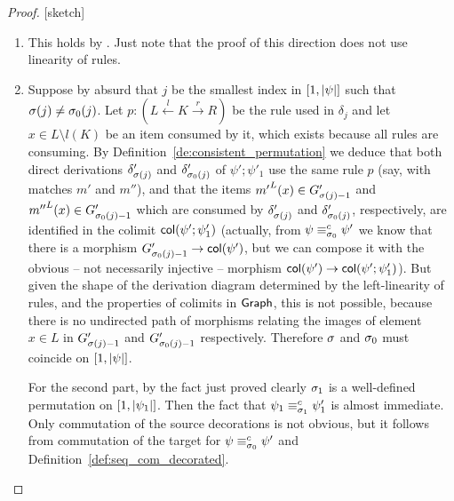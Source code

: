 \begin{proof}{[sketch]}
\begin{enumerate}
\item This holds by  \cite[Thm. 3.5.3]{Handbook}. Just note that the proof of this direction does not use linearity of rules. 

\item Suppose by absurd that  $j$ be the smallest index in $[{1},{|\psi|}]$ such that 
$\sigma(j) \not =  \sigma_0(j)$. Let  $p : (L \stackrel{l}{\leftarrow} K \stackrel{r}{\rightarrow} R)$ be the 
rule used in $\delta_j$ and let 
$x \in L \setminus{l(K)}$ be an item consumed by it, which exists because all rules are consuming. 
By Definition~\ref{de:consistent_permutation} we deduce that both direct derivations $\delta'_{\sigma(j)}$
and $\delta'_{\sigma_0(j)}$ of $\psi';\psi'_1$ use the same rule $p$ (say, with matches $m'$ and $m''$), 
and that 
the items ${m'}^L(x) \in G'_{\sigma(j)-1}$ and 
${m''}^L(x) \in G'_{\sigma_0(j)-1}$ which are consumed by $\delta'_{\sigma(j)}$ and $\delta'_{\sigma_0(j)}$, 
respectively, are identified in the colimit $\mathsf{col}({\psi';\psi'_1})$ (actually, from $\psi  \equiv^{c}_{\sigma_0} \psi'$
we know that there is a morphism $G'_{\sigma_0(j)-1} \to \mathsf{col}({\psi'})$, but we can compose it with 
the obvious -- not necessarily injective -- morphism  $\mathsf{col}({\psi'}) \to  \mathsf{col}({\psi';\psi'_1})$).
 But given the shape of the derivation diagram determined
by the left-linearity of rules, and the 
properties of colimits in $\mathsf{Graph}$, this is not possible, because there is no undirected path of morphisms 
relating the images of element $x \in L$ in  $G'_{\sigma(j)-1}$ and $G'_{\sigma_0(j)-1}$ respectively.
Therefore $\sigma$ and $\sigma_0$ must coincide on $[{1},{|\psi|}]$.

For the second part, by the fact just proved clearly $\sigma_1$ is a
well-defined permutation on $[{1},{|\psi_1|}]$. Then the fact that
$\psi_1 \equiv^{c}_{\sigma_1} \psi'_1$ is almost immediate. Only
commutation of the source decorations is not obvious, but it follows
from commutation of the target for $\psi \equiv^{c}_{\sigma_0} \psi'$
and Definition~\ref{def:seq_com_decorated}.


\end{enumerate}
\end{proof}
